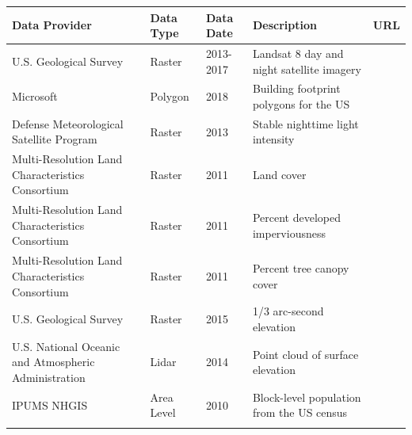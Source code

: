\documentclass[final,3p,times,twocolumn,sort&compress]{elsarticle}
\begin{document}
\begin{tabu}to \textwidth{ X[l]  X[c]  X[c] X[l] X[l] }
 \hline
 Data Provider & Data Type & Data Date & Description & URL \\
 \hline
U.S. Geological Survey  & Raster  & 2013-2017 &
    Landsat 8 day and night satellite imagery &  \\
Microsoft  & Polygon  & 2018 & Building footprint polygons for the US &
     \\
Defense Meteorological Satellite Program  & Raster  & 2013 &
    Stable nighttime light intensity &  \\
Multi-Resolution Land Characteristics Consortium  & Raster  & 2011 &
    Land cover &  \\
Multi-Resolution Land Characteristics Consortium  & Raster  & 2011 &
    Percent developed imperviousness &  \\
Multi-Resolution Land Characteristics Consortium  & Raster  & 2011 &
    Percent tree canopy cover &  \\
U.S. Geological Survey  & Raster  & 2015 & 1/3 arc-second elevation &
     \\
U.S. National Oceanic and Atmospheric Administration  & Lidar  & 2014 & Point cloud of surface elevation &
     \\
IPUMS NHGIS  & Area Level  & 2010 &
    Block-level population from the US census & \cite{nhgis}\\
\hline
\label{tab:data}
\end{tabu}
\end{document}
